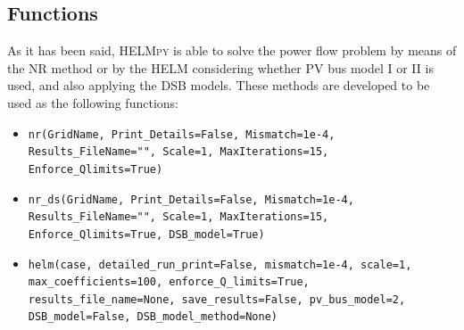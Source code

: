 \documentclass[12pt]{article}
\begin{document}
\subsection{Functions}
As it has been said, \textsc{HELMpy} is able to solve the power flow problem by means of the NR method or by the HELM considering whether PV bus model I or II is used, and also applying the DSB models. These methods are developed to be used as the following functions:
\begin{itemize}
	\item \texttt{nr(GridName, Print_Details=False, Mismatch=1e-4,\\ Results_FileName="", Scale=1, MaxIterations=15,\\ Enforce_Qlimits=True)}
	\item \texttt{nr_ds(GridName, Print_Details=False, Mismatch=1e-4,\\ Results_FileName="", Scale=1, MaxIterations=15,\\ Enforce_Qlimits=True, DSB_model=True)}
	\item \texttt{helm(case, detailed_run_print=False, mismatch=1e-4, scale=1, max_coefficients=100, enforce_Q_limits=True, results_file_name=None, save_results=False, pv_bus_model=2, DSB_model=False, DSB_model_method=None)}
\end{itemize}
\end{document}

